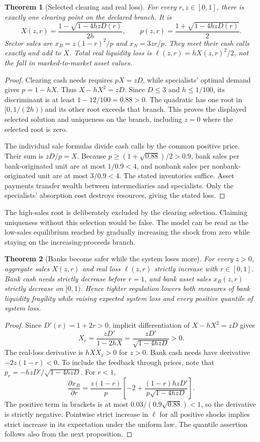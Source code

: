 \documentclass[11pt]{article}
\newtheorem{theorem}{Theorem}
\theoremstyle{remark}\newtheorem{remark}[theorem]{Remark}
\begin{document}
\begin{theorem}[Selected clearing and real loss]
For every $r,z\in[0,1]$, there is exactly one clearing point on the declared branch. It is
\[
 X(z,r)=\frac{1-\sqrt{1-4hzD(r)}}{2h},\qquad
 p(z,r)=\frac{1+\sqrt{1-4hzD(r)}}2.
\]
Sector sales are $x_B=z(1-r)^2/p$ and $x_N=3zr/p$. They meet their cash calls exactly and add to $X$. Total real liquidity loss is $\ell(z,r)=hX(z,r)^2/2$, not the fall in marked-to-market asset values.
\end{theorem}
\begin{proof}
Clearing cash needs requires $pX=zD$, while specialists' optimal demand gives $p=1-hX$. Thus $X-hX^2=zD$. Since $D\le3$ and $h\le1/100$, its discriminant is at least $1-12/100=0.88>0$. The quadratic has one root in $[0,1/(2h))$ and its other root exceeds that branch. This proves the displayed selected solution and uniqueness on the branch, including $z=0$ where the selected root is zero.

The individual sale formulas divide cash calls by the common positive price. Their sum is $zD/p=X$. Because $p\ge(1+\sqrt{0.88})/2>0.9$, bank sales per bank-originated unit are at most $1/0.9<4$, and nonbank sales per nonbank-originated unit are at most $3/0.9<4$. The stated inventories suffice. Asset payments transfer wealth between intermediaries and specialists. Only the specialists' absorption cost destroys resources, giving the stated loss.
\end{proof}

The high-sales root is deliberately excluded by the clearing selection. Claiming uniqueness without this selection would be false. The model can be read as the low-sales equilibrium reached by gradually increasing the shock from zero while staying on the increasing-proceeds branch.

\begin{theorem}[Banks become safer while the system loses more]
For every $z>0$, aggregate sales $X(z,r)$ and real loss $\ell(z,r)$ strictly increase with $r\in[0,1]$. Bank cash needs strictly decrease before $r=1$, and bank asset sales $x_B(z,r)$ strictly decrease on $[0,1)$. Hence tighter regulation lowers both measures of bank liquidity fragility while raising expected system loss and every positive quantile of system loss.
\end{theorem}
\begin{proof}
Since $D'(r)=1+2r>0$, implicit differentiation of $X-hX^2=zD$ gives
\[
 X_r=\frac{zD'}{1-2hX}=\frac{zD'}{\sqrt{1-4hzD}}>0.
\]
The real-loss derivative is $hXX_r>0$ for $z>0$. Bank cash needs have derivative $-2z(1-r)<0$. To include the feedback through prices, note that $p_r=-hzD'/\sqrt{1-4hzD}$. For $r<1$,
\[
 \frac{\partial x_B}{\partial r}
 =\frac{z(1-r)}p\left[-2+
 \frac{(1-r)hzD'}{p\sqrt{1-4hzD}}\right].
\]
The positive term in brackets is at most $0.03/(0.9\sqrt{0.88})<1$, so the derivative is strictly negative. Pointwise strict increase in $\ell$ for all positive shocks implies strict increase in its expectation under the uniform law. The quantile assertion follows also from the next proposition.
\end{proof}
\end{document}
